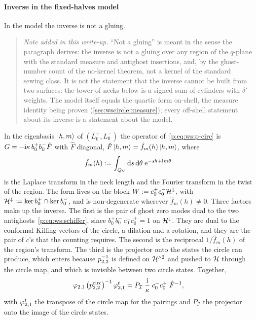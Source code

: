 \paragraph{Inverse in the fixed-halves model}
\label{p:sec:ws:model-inverse}

In the model the inverse is not a gluing.
\begin{quote}
  \small
  \emph{Note added in this write-up.}
  ``Not a gluing'' is meant in the sense the paragraph derives: the inverse is not a gluing over any region of the $q$-plane with the standard measure and antighost insertions, and, by the ghost-number count of the no-kernel theorem, not a kernel of the standard sewing class.
  It is not the statement that the inverse cannot be built from two surfaces: the tower of necks below is a signed sum of cylinders with $\delta'$ weights.
  The model itself equals the quartic form on-shell, the measure identity being proven (\cref{sec:wscircle:measure}); every off-shell statement about its inverse is a statement about the model.
\end{quote}
In the eigenbasis $\ket{h, m}$ of $(L_0^+, L_0^-)$ the operator of~\eqref{p:eq:ws:p-circ} is $G = - \mathrm{i} \kappa \, b_0^+ b_0^- \hat F$ with $\hat F$ diagonal, $\hat F \ket{h, m} = \hat f_m(h) \ket{h, m}$, where
\begin{equation}
  \label{p:eq:ws:transform}
  \hat f_m(h)
    := \int_{Q_V} \mathrm{d} s \, \mathrm{d}\theta \; \mathrm{e}^{- s h + \mathrm{i} m \theta}
\end{equation}
is the Laplace transform in the neck length and the Fourier transform in the twist of the region.
The form lives on the block $W := c_0^+ c_0^- \mathcal{H}^\downarrow$, with $\mathcal{H}^\downarrow := \ker b_0^+ \cap \ker b_0^-$, and is non-degenerate wherever $\hat f_m(h) \neq 0$.
Three factors make up the inverse.
The first is the pair of ghost zero modes dual to the two antighosts~\eqref{p:eq:ws:schiffer}, since $b_0^+ b_0^- \, c_0^- c_0^+ = 1$ on $\mathcal{H}^\downarrow$.
They are dual to the conformal Killing vectors of the circle, a dilation and a rotation, and they are the pair of $c$'s that the counting requires.
The second is the reciprocal $1 / \hat f_m(h)$ of the region's transform.
The third is the projector onto the states the circle can produce, which enters because $p_{2,2}^{-1}$ is defined on $\mathcal{H}^{\wedge 2}$ and pushed to $\mathcal{H}$ through the circle map, and which is invisible between two circle states.
Together,
\begin{equation}
  \label{p:eq:ws:inverse-circle}
  \varphi_{2,1} \, \big( p_{2,2}^{\mathrm{circ}} \big)^{-1} \, {\varphi_{2,1}^t}
    = P_{\mathcal I} \; \frac{\mathrm{i}}{\kappa} \; c_0^- c_0^+ \; \hat F^{-1},
\end{equation}
with ${\varphi_{2,1}^t}$ the transpose of the circle map for the pairings and $P_{\mathcal I}$ the projector onto the image of the circle states.

